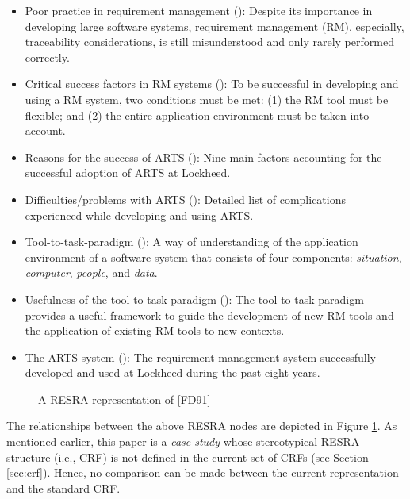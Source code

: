 \small
\begin{itemize}
\item {\sf Poor practice in requirement management ()\/}: Despite its importance in developing large software
  systems, requirement management (RM), especially, traceability
  considerations, is still misunderstood and only rarely performed
  correctly.
  
\item {\sf Critical success factors in RM systems ()}:
  To be successful in developing and using a RM system, two conditions must
  be met: (1) the RM tool must be flexible; and (2) the entire application
  environment must be taken into account.
  
\item {\sf Reasons for the success of ARTS ()}: Nine
  main factors accounting for the successful adoption of ARTS at Lockheed.
  
\item {\sf Difficulties/problems with ARTS ()}:
  Detailed list of complications experienced while developing and using
  ARTS.

  \item {\sf Tool-to-task-paradigm ()}: A way of
  understanding of the application environment of a software system that
  consists of four components: {\it situation\/}, {\it computer\/}, {\it
  people\/}, and {\it data\/}.
  
\item {\sf Usefulness of the tool-to-task paradigm ()}:
  The tool-to-task paradigm provides a useful framework to guide the
  development of new RM tools and the application of existing RM tools to
  new contexts.
  
\item {\sf The ARTS system ()}: The requirement
  management system successfully developed and used at Lockheed during the
  past eight years. 
\end{itemize}
\normalsize
{}

\begin{figure}[hbtp]
 \caption{A RESRA representation of [FD91]}
  \label{fig:arts-resra}
\end{figure}

The relationships between the above  RESRA nodes are depicted in
Figure \ref{fig:arts-resra}. As mentioned earlier, this paper is a {\it
case study\/} whose stereotypical RESRA structure (i.e., CRF) is not
defined in the current set of CRFs (see Section \ref{sec:crf}). Hence, no
comparison can be made between the current representation and the standard
CRF. 

